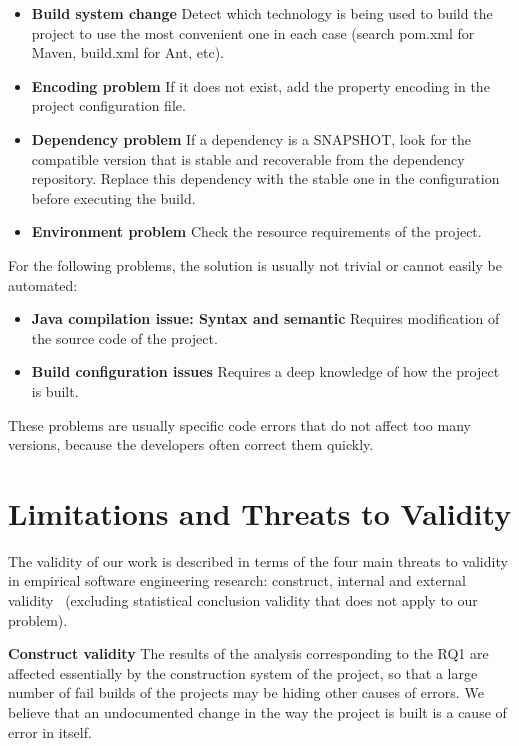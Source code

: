 \begin{itemize}
	\item \textbf{Build system change} Detect which technology is being used to build the project to use the most convenient one in each case (search pom.xml for Maven, build.xml for Ant, etc).
	\item \textbf{Encoding problem} If it does not exist, add the property encoding in the project configuration file.
	\item \textbf{Dependency problem} If a dependency is a SNAPSHOT, look for the compatible version that is stable and recoverable from the dependency repository. Replace this dependency with the stable one in the configuration before executing the build.
	\item \textbf{Environment problem} Check the resource requirements of the project.
\end{itemize}

For the following problems, the solution is usually not trivial or cannot easily be automated:

\begin{itemize}
	\item \textbf{Java compilation issue: Syntax and semantic} Requires modification of the source code of the project.
	\item \textbf{Build configuration issues} Requires a deep knowledge of how the project is built.
\end{itemize}

These problems are usually specific code errors that do not affect too many versions, because the developers often correct them quickly.

\section{Limitations and Threats to Validity}

The validity of our work is described in terms of the four main threats to validity in empirical software engineering research: construct, internal and external validity~\cite{Wohlin2012} (excluding statistical conclusion validity that does not apply to our problem).


\textbf{Construct validity} 
The results of the analysis corresponding to the RQ1 are affected essentially by the construction system of the project, so that a large number of fail builds of the projects may be hiding other causes of errors. We believe that an undocumented change in the way the project is built is a cause of error in itself.

